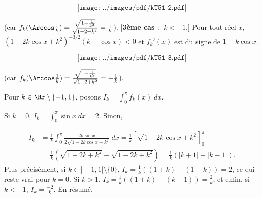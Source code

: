 {\begin{enumerate}
{\begin{itemize}
$$\texttt{[image: ../images/pdf/kT51-2.pdf]}$$

(car $f_k(\Arccos\frac{1}{k})=\frac{\sqrt{1-\frac{1}{k^2}}}{\sqrt{1-2+k^2}}=\frac{1}{k}$).
[\textbf{3ème cas}~:~$k<-1$.] Pour tout réel $x$, $(1-2k\cos x+k^2)^{-3/2}(k-\cos x)<0$ et $f_k'(x)$ est du signe de
$1-k\cos x$.

$$\texttt{[image: ../images/pdf/kT51-3.pdf]}$$



(car $f_k(\Arccos\frac{1}{k})=\frac{\sqrt{1-\frac{1}{k^2}}}{\sqrt{1-2+k^2}}=-\frac{1}{k}$).

\end{itemize}
Pour $k\in\Rr\setminus\{-1,1\}$, posons $I_k=\int_{0}^{\pi}f_k(x)\;dx$.

Si $k=0$, $I_k=\int_{0}^{\pi}\sin x\;dx=2$. Sinon,

\begin{align*}
I_k&=\frac{1}{k}\int_{0}^{\pi}\frac{2k\sin x}{2\sqrt{1-2k\cos x+k^2}}\;dx=\frac{1}{k}
\left[\sqrt{1-2k\cos x+k^2}\right]_0^\pi\\
 &=\frac{1}{k}(\sqrt{1+2k+k^2}-\sqrt{1-2k+k^2})=\frac{1}{k}(|k+1|-|k-1|).
\end{align*}
Plus précisément, si $k\in]-1,1[\setminus\{0\}$, $I_k=\frac{1}{k}((1+k)-(1-k))=2$, ce qui reste vrai pour $k=0$. Si
$k>1$, $I_k=\frac{1}{k}((1+k)-(k-1))=\frac{2}{k}$, et enfin, si $k<-1$, $I_k=\frac{-2}{k}$. En résumé,

\begin{center}
\shadowbox{
$\mbox{Si}\;k\in]-1,1[,\;I_k=2\;\mbox{et si}\;k\in]-\infty,-1[\cup]1,+\infty[,\;I_k=\frac{2}{|k|}.$
}
\end{center}
}
\end{enumerate}
}
